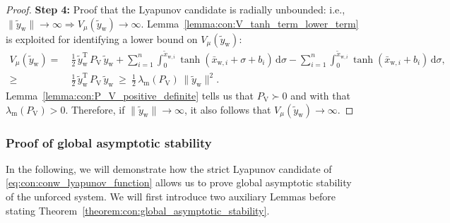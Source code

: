 \begin{proof}
    \textbf{Step 4:} Proof that the Lyapunov candidate is radially unbounded: i.e., $\lVert \tilde{y}_\mathrm{w} \rVert \rightarrow \infty \Rightarrow V_\mu(\tilde{y}_\mathrm{w}) \rightarrow \infty$. Lemma~\ref{lemma:con:V_tanh_term_lower_term} is exploited for identifying a lower bound on $V_\mu(\tilde{y}_\mathrm{w})$:
    \begin{equation}
    \begin{split}
        V_\mu(\tilde{y}_\mathrm{w}) =& \: \frac{1}{2} \, \tilde{y}_\mathrm{w}^\mathrm{T} \, P_\mathrm{V} \, \tilde{y}_\mathrm{w} + \sum_{i=1}^n \int_{0}^{\tilde{x}_{\mathrm{w},i}} \tanh(\bar{x}_{\mathrm{w},i}+\sigma+b_i) \, \mathrm{d} \sigma - \sum_{i=1}^n \int_{0}^{\tilde{x}_{\mathrm{w},i}} \tanh(\bar{x}_{\mathrm{w},i}+b_i) \, \mathrm{d} \sigma,\\
        \geq& \: \frac{1}{2} \, \tilde{y}_\mathrm{w}^\mathrm{T} \, P_\mathrm{V} \, \tilde{y}_\mathrm{w} \: \geq \: \frac{1}{2} \, \lambda_\mathrm{m}(P_\mathrm{V}) \, \lVert \tilde{y}_\mathrm{w} \rVert^2.
    \end{split}
    \end{equation}
    Lemma~\ref{lemma:con:P_V_positive_definite} tells us that $P_\mathrm{V} \succ 0$ and with that $\lambda_\mathrm{m}(P_\mathrm{V}) > 0$. Therefore, if $\lVert \tilde{y}_\mathrm{w} \rVert \rightarrow \infty$, it also follows that $V_\mu(\tilde{y}_\mathrm{w}) \rightarrow \infty$.
\end{proof}

\subsubsection{Proof of global asymptotic stability}

In the following, we will demonstrate how the strict Lyapunov candidate of \eqref{eq:con:conw_lyapunov_function} allows us to prove global asymptotic stability of the unforced system. We will first introduce two auxiliary Lemmas before stating Theorem~\ref{theorem:con:global_asymptotic_stability}.

